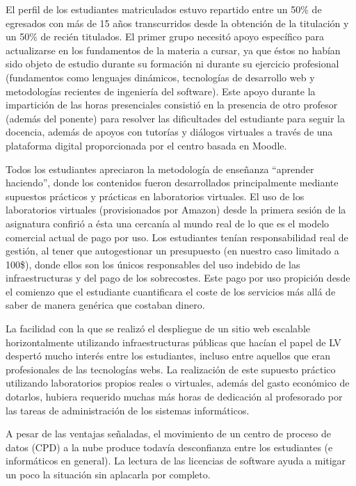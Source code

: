 \documentclass[conference]{IEEEtran}
\begin{document}
El perfil de los estudiantes matriculados estuvo repartido entre un
50\% de egresados con más de 15 años transcurridos desde la obtención de la
titulación y un 50\% de recién titulados.
El primer grupo necesitó apoyo específico para actualizarse en los fundamentos
de la materia a cursar, ya que éstos no habían sido objeto de estudio durante su
formación ni durante su ejercicio profesional (fundamentos como lenguajes
dinámicos, tecnologías de desarrollo web y metodologías recientes de ingeniería
del software). Este apoyo durante la impartición de las horas presenciales
consistió en la presencia de otro profesor (además del ponente) para resolver
las dificultades del estudiante para seguir la docencia, además de apoyos con
tutorías y diálogos virtuales a través de una plataforma digital proporcionada
por el centro basada en Moodle.

Todos los estudiantes apreciaron la metodología de enseñanza ``aprender
haciendo'', donde los contenidos fueron desarrollados principalmente mediante
supuestos prácticos y prácticas en laboratorios virtuales. El uso de los
laboratorios virtuales (provisionados por Amazon) desde la primera sesión de la
asignatura confirió a ésta una cercanía al mundo real de lo que es el modelo comercial actual de pago por
uso. Los estudiantes tenían responsabilidad real de
gestión,  al tener que  autogestionar un presupuesto (en nuestro caso limitado a
100\$), donde ellos son los únicos responsables del uso indebido de las
infraestructuras y del pago de los sobrecostes. Este pago por uso propición desde
el comienzo que el estudiante cuantificara el coste de los servicios más allá
de saber de manera genérica que costaban dinero. 

La facilidad con la que se realizó el despliegue de un sitio web escalable
horizontalmente utilizando infraestructuras públicas que hacían el papel de LV
despertó mucho interés entre los estudiantes, incluso entre aquellos que eran
profesionales de las tecnologías webs. La realización de este supuesto práctico
utilizando laboratorios propios reales o virtuales, además del gasto
económico de dotarlos, hubiera requerido muchas más horas de
dedicación al profesorado  por las tareas  de administración de los sistemas
informáticos.

A pesar de las ventajas señaladas, el movimiento de un centro de proceso de datos (CPD) a la nube produce todavía desconfianza entre los estudiantes (e informáticos en general).
La lectura de las licencias de software ayuda a mitigar un poco la situación sin aplacarla por completo.
\end{document}
